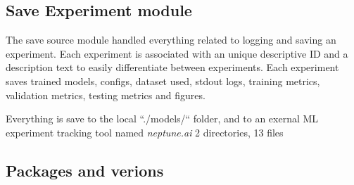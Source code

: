 \iffalse
  The configuration module is to keep everything which is configurable and relevant
  for the experiment in one place. This helps keeping code changes down to a minumum,
  and it's easy to go back in time and check details of a ran experiment at a glans.

  The experiment pipeline contains multiple paramteres that can be adjusted and configured to alter the experiments.
  Configuration is done through the use of the ``config.yaml'' file defined in the project source code.
  This config file is used to configure the different aspects of the projects to be run.
  Ranging from the selected dataset and data files to be used, to the selected model and model structure, with model parameters and random seed.

  The config is parsed through at runtime reading the needed information when it becomes relevant.
  The file can be found in the source code at ``./config.yaml''.
  An example of a config is in the appendix at \Cref{cha:experiment-framework-example-config}.
\fi



\subsection{Save Experiment module}

The save source module handled everything related to logging and saving an experiment.
Each experiment is associated with an unique descriptive ID and a description text to easily
differentiate between experiments.
Each experiment saves trained models, configs, dataset used, stdout logs, training metrics, validation metrics,
testing metrics and figures.

Everything is save to the local ``./models/`` folder, and to an exernal ML experiment tracking tool
named \textit{neptune.ai}
2 directories, 13 files

\subsection{Packages and verions}


